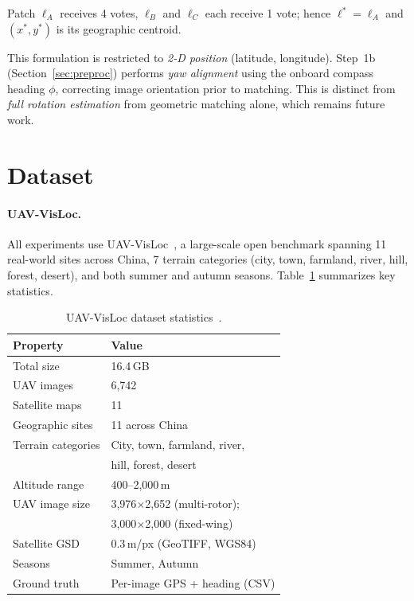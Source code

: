 \documentclass[10pt]{article}
\theoremstyle{plain}
\theoremstyle{definition}
\begin{document}
\noindent Patch $\ell_A$ receives 4 votes, $\ell_B$ and $\ell_C$ each receive
1 vote; hence $\ell^* = \ell_A$ and $(x^*,y^*)$ is its geographic centroid.

This formulation is restricted to \emph{2-D position} (latitude, longitude).
Step~1b (Section~\ref{sec:preproc}) performs \emph{yaw alignment} using the onboard compass heading $\phi$, correcting image orientation prior to matching. This is distinct from \emph{full rotation estimation} from geometric matching alone, which remains future work.

\section{Dataset}
\label{sec:dataset}

\paragraph{UAV-VisLoc.}
All experiments use UAV-VisLoc~\cite{uavvisloc2024}, a large-scale open
benchmark spanning 11 real-world sites across China, 7 terrain categories
(city, town, farmland, river, hill, forest, desert), and both summer and
autumn seasons.
Table~\ref{tab:dataset} summarizes key statistics.

\begin{table}[htbp]
\caption{UAV-VisLoc dataset statistics~\cite{uavvisloc2024}.}
\label{tab:dataset}
\centering\small
\begin{tabular}{ll}
\toprule
\textbf{Property} & \textbf{Value} \\
\midrule
Total size         & 16.4\,GB \\
UAV images         & 6,742 \\
Satellite maps     & 11 \\
Geographic sites   & 11 across China \\
Terrain categories & City, town, farmland, river, \\
                   & \quad hill, forest, desert \\
Altitude range     & 400--2,000\,m \\
UAV image size     & 3,976$\times$2,652 (multi-rotor);\\
                   & 3,000$\times$2,000 (fixed-wing) \\
Satellite GSD      & 0.3\,m/px (GeoTIFF, WGS84) \\
Seasons            & Summer, Autumn \\
Ground truth       & Per-image GPS + heading (CSV) \\
\bottomrule
\end{tabular}
\end{table}
\end{document}
